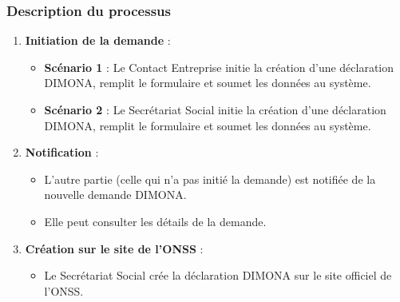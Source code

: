 \vspace{0.5cm}

\subsubsection{Description du processus}

\begin{enumerate}
  \item \textbf{Initiation de la demande} :
    \begin{itemize}
      \item \textbf{Scénario 1} : Le Contact Entreprise initie la création d'une déclaration DIMONA, remplit le formulaire et soumet les données au système.
      \item \textbf{Scénario 2} : Le Secrétariat Social initie la création d'une déclaration DIMONA, remplit le formulaire et soumet les données au système.
    \end{itemize}

  \item \textbf{Notification} :
    \begin{itemize}
      \item L'autre partie (celle qui n'a pas initié la demande) est notifiée de la nouvelle demande DIMONA.
      \item Elle peut consulter les détails de la demande.
    \end{itemize}

  \item \textbf{Création sur le site de l'ONSS} :
    \begin{itemize}
      \item Le Secrétariat Social crée la déclaration DIMONA sur le site officiel de l'ONSS.
    \end{itemize}


\end{enumerate}
